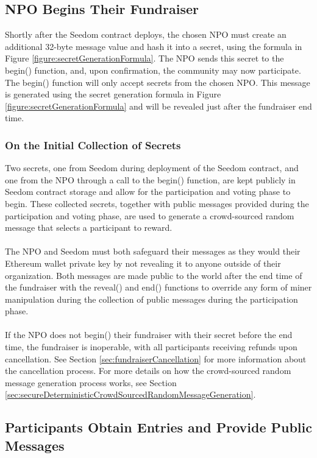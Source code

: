 \documentclass[11pt]{article}
\begin{document}
\subsection{NPO Begins Their Fundraiser}

Shortly after the Seedom contract deploys, the chosen NPO must create an additional 32-byte message value and hash it into a secret, using the formula in Figure \ref{figure:secretGenerationFormula}. The NPO sends this secret to the begin() function, and, upon confirmation, the community may now participate. The begin() function will only accept secrets from the chosen NPO. This message is generated using the secret generation formula in Figure \ref{figure:secretGenerationFormula} and will be revealed just after the fundraiser end time.

\subsubsection{On the Initial Collection of Secrets}

Two secrets, one from Seedom during deployment of the Seedom contract, and one from the NPO through a call to the begin() function, are kept publicly in Seedom contract storage and allow for the participation and voting phase to begin. These collected secrets, together with public messages provided during the participation and voting phase, are used to generate a crowd-sourced random message that selects a participant to reward.\\\\
The NPO and Seedom must both safeguard their messages as they would their Ethereum wallet private key by not revealing it to anyone outside of their organization. Both messages are made public to the world after the end time of the fundraiser with the reveal() and end() functions to override any form of miner manipulation during the collection of public messages during the participation phase.\\\\
If the NPO does not begin() their fundraiser with their secret before the end time, the fundraiser is inoperable, with all participants receiving refunds upon cancellation. See Section \ref{sec:fundraiserCancellation} for more information about the cancellation process. For more details on how the crowd-sourced random message generation process works, see Section \ref{sec:secureDeterministicCrowdSourcedRandomMessageGeneration}.

\subsection{Participants Obtain Entries and Provide Public Messages}
\end{document}
